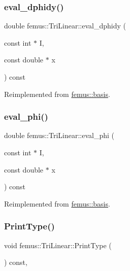 \subsubsection{\texorpdfstring{eval\+\_\+dphidy()}{eval\_dphidy()}}
{\footnotesize\ttfamily double femus\+::\+Tri\+Linear\+::eval\+\_\+dphidy (\begin{DoxyParamCaption}\item[{const int $\ast$}]{I,  }\item[{const double $\ast$}]{x }\end{DoxyParamCaption}) const\hspace{0.3cm}{\ttfamily [virtual]}}



Reimplemented from \mbox{\hyperlink{classfemus_1_1basis_a2819fac9aae797156b9efec8a0b85cc1}{femus\+::basis}}.

\mbox{\label{classfemus_1_1_tri_linear_ac107e6f9e9f8e34961e40bf0610d54d1}} 
\subsubsection{\texorpdfstring{eval\+\_\+phi()}{eval\_phi()}}
{\footnotesize\ttfamily double femus\+::\+Tri\+Linear\+::eval\+\_\+phi (\begin{DoxyParamCaption}\item[{const int $\ast$}]{I,  }\item[{const double $\ast$}]{x }\end{DoxyParamCaption}) const\hspace{0.3cm}{\ttfamily [virtual]}}



Reimplemented from \mbox{\hyperlink{classfemus_1_1basis_a89b0797cdccffae5ff6d059b32016ae5}{femus\+::basis}}.

\mbox{\label{classfemus_1_1_tri_linear_a1baabe41cae6c6d1e9e120b1b9869d2c}} 
\subsubsection{\texorpdfstring{Print\+Type()}{PrintType()}}
{\footnotesize\ttfamily void femus\+::\+Tri\+Linear\+::\+Print\+Type (\begin{DoxyParamCaption}{ }\end{DoxyParamCaption}) const\hspace{0.3cm}{\ttfamily [inline]}, {\ttfamily [virtual]}}



